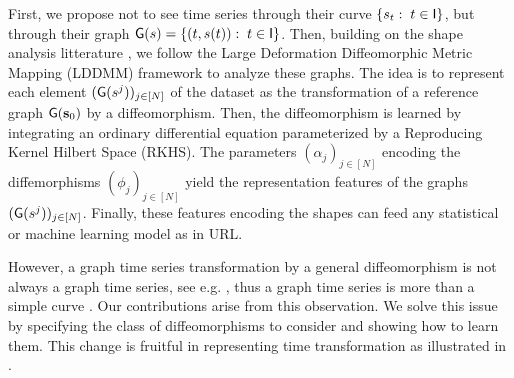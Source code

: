 
 First, we propose not to see time series through their curve $\{s_t:\; t\in\mathsf{I}\}$, but through their graph $\mathsf{G}(s)=\{(t,s(t)):\; t\in \mathsf{I}\} $. 
 Then, building on the shape analysis litterature \cite{beg2005computing,vaillant2004statistics}, we follow the Large Deformation Diffeomorphic Metric Mapping (LDDMM) framework \cite{beg2005computing,vaillant2004statistics} to analyze these graphs.
  The idea is to represent each element $(\mathsf{G}(s^j))_{j\in[N]}$ of the dataset as the transformation of a reference graph $\mathsf{G}(\mathbf{s}_0)$ by a diffeomorphism.
  Then, the diffeomorphism is learned by integrating an ordinary differential equation parameterized by a Reproducing Kernel Hilbert Space (RKHS).
   The parameters $(\alpha_j)_{j\in[N]}$ encoding the diffemorphisms $(\phi_j)_{j\in[N]}$ yield the representation features of the graphs $(\mathsf{G}(s^j))_{j\in[N]}$.
    Finally, these features encoding the shapes can feed any statistical or machine learning model as in URL.

   However, a graph time series transformation by a general diffeomorphism is not always a graph time series, see e.g. , thus a graph time series is more than a simple curve \cite{glaunes2008large}.
   Our contributions arise from this observation.
    We solve this issue by specifying the class of diffeomorphisms to consider and showing how to learn them.
     This change is fruitful in representing time transformation as illustrated in .

